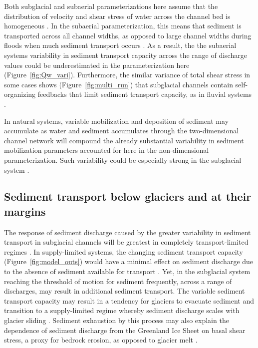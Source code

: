 \documentclass[11pt]{article}
\begin{document}
Both subglacial and subaerial parameterizations here assume that the distribution of velocity and shear stress of water across the channel bed is homogeneous \citep[Section~\ref{sect:sub_mode}~and~\ref{sect:fluv}; e.g. ]{yager2018}.
In the subaerial parameterization, this means that sediment is transported across all channel widths, as opposed to large channel widths during floods when much sediment transport occurs \citep{wolman1960}.
As a result, the  the subaerial systems variability in sediment transport capacity across the range of discharge values could be underestimated in the parameterization here (Figure~\ref{fig:Qw_vari}).
Furthermore, the similar variance of total shear stress in some cases shows (Figure~\ref{fig:multi_run}) that subglacial channels contain self-organizing feedbacks that limit sediment transport capacity, as in fluvial systems \citep{phillips2016}.

In natural systems, variable mobilization and deposition of sediment may accumulate as water and sediment accumulates through the two-dimensional channel network will compound the already substantial variability in sediment mobilization parameters accounted for here in the non-dimensional parameterization.
Such variability could be especially strong in the subglacial system \citep{delaney2023}.



\subsection{Sediment transport below glaciers and at their margins}

The response of sediment discharge caused by the greater variability in sediment transport in subglacial channels will be greatest in completely transport-limited regimes \citep[e.g.][]{kasmalkar2019}.
In supply-limited systems, the changing sediment transport capacity (Figure~\ref{fig:model_outs}) would have a minimal effect on sediment discharge due to the absence of sediment available for transport \citep{delaney2019}.
Yet, in the subglacial system reaching the threshold of motion for sediment frequently, across a range of discharges,  may result in additional sediment transport.
The variable sediment transport capacity may result in a tendency for glaciers to evacuate sediment and transition to a supply-limited regime whereby sediment discharge scales with glacier sliding  \citep[e.g.][]{herman2015}.
Sediment exhaustion by this process may also explain the dependence of sediment discharge from the Greenland Ice Sheet on basal shear stress, a proxy for bedrock erosion, as opposed to glacier melt \citep{overeem2017}.
\end{document}
